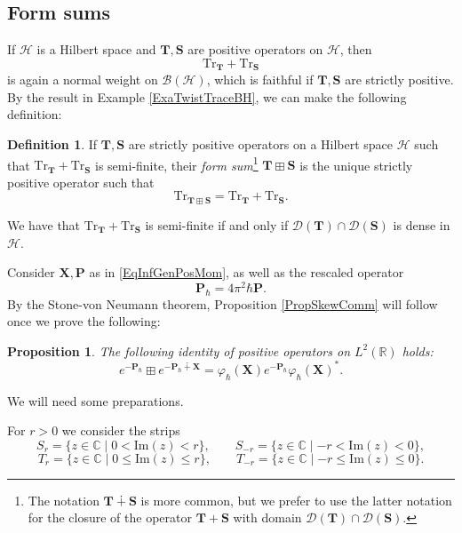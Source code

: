 \documentclass[11pt, reqno]{amsart}
\newtheorem{prop}[theorem]{Proposition}
\theoremstyle{definition}
\newtheorem{defn}[theorem]{Definition}
\numberwithin{equation}{section}
\def\C{\mathbb C}
\def\msD{\mathscr D}
\def\R{\mathbb R}
\newcommand{\Hsp}{\mathcal{H}}
\newcommand{\Bc}{\mathcal{B}}
\newcommand{\Pb}{\mathbf{P}}
\newcommand{\Xb}{\mathbf{X}}
\newcommand{\Imm}{\mathrm{Im}}
\newcommand{\Tr}{\mathrm{Tr}}
\newcommand{\Sb}{\mathbf{S}}
\newcommand{\Tb}{\mathbf{T}}
\begin{document}
\subsection{Form sums}\label{SecPropSkewComm}

If $\Hsp$ is a Hilbert space and $\Tb,\Sb$ are positive operators on $\Hsp$, then 
\[
\Tr_{\Tb}+ \Tr_{\Sb}
\]
is again a normal weight on $\Bc(\Hsp)$, which is faithful if $\Tb,\Sb$ are strictly positive. By the result in Example \ref{ExaTwistTraceBH}, we can make the following definition:  
\begin{defn}\label{DefFormSum}
If $\Tb,\Sb$ are strictly positive operators on a Hilbert space $\Hsp$ such that $\Tr_{\Tb}+ \Tr_{\Sb}$ is semi-finite, their \emph{form sum}\footnote{The notation $\Tb\dotplus \Sb$ is more common, but we prefer to use the latter notation for the closure of the operator $\Tb+\Sb$ with domain $\msD(\Tb)\cap \msD(\Sb)$.} $\Tb\boxplus \Sb$ is the unique strictly positive operator such that 
\[
\Tr_{\Tb\boxplus \Sb} = \Tr_{\Tb}+ \Tr_{\Sb}.
\]
\end{defn}
We have that $\Tr_{\Tb}+ \Tr_{\Sb}$ is semi-finite if and only if $\msD(\Tb)\cap \msD(\Sb)$ is dense in $\Hsp$. 


Consider $\Xb,\Pb$ as in \eqref{EqInfGenPosMom}, as well as the rescaled operator
\begin{equation}\label{EqRescMomOp}
\Pb_{\hbar} = 4\pi^2\hbar \Pb.
\end{equation}
By the Stone-von Neumann theorem, Proposition \ref{PropSkewComm} will follow once we prove the following: 
\begin{prop}
The following identity of positive operators on $L^2(\R)$ holds:
\begin{equation}\label{EqToProve}
e^{-\Pb_{\hbar}} \boxplus e^{-\Pb_{\hbar}\dotplus \Xb} = \varphi_{\hbar}(\Xb) e^{-\Pb_{\hbar}} \varphi_{\hbar}(\Xb)^*.
\end{equation}
\end{prop}

We will need some preparations.

For $r>0$ we consider the strips 
\begin{equation}\label{NotStrips}
S_{r} = \{z\in \C\mid 0< \Imm(z) <r\},\qquad S_{-r} = \{z\in \C\mid -r <\Imm(z) < 0\},  
\end{equation}
\begin{equation}
T_{r} = \{z\in \C\mid 0\leq \Imm(z) \leq r\},\qquad T_{-r} = \{z\in \C\mid -r \leq \Imm(z) \leq 0\}. 
\end{equation}
\end{document}
